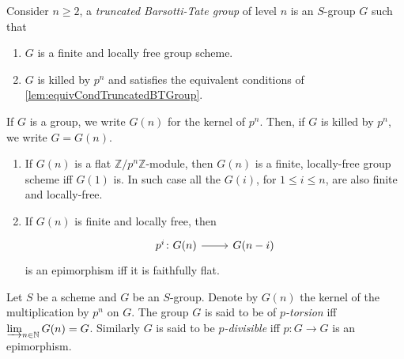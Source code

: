 \begin{defn}
	Consider $n \geq 2$, a {\em truncated Barsotti-Tate group} of level $n$
	is an $S$-group $G$ such that
\begin{enumerate}
	\item $G$ is a finite and locally free group scheme.
	\item $G$ is killed by $p^n$ and satisfies the equivalent conditions of 
		\cref{lem:equivCondTruncatedBTGroup}.
\end{enumerate}
\end{defn}


\begin{defn}[]
	If $G$ is a group, we write $G(n)$ for the kernel of $p^n$.
	Then, if $G$ is killed by $p^n$, we write $G = G(n)$.
\end{defn}


\begin{lem}\label{FlatnessDescentTrBTGroup}\leavevmode\vspace{-.2\baselineskip}
\begin{enumerate}
	\item If $G(n)$ is a flat $\mathbb{Z}/p^n\mathbb{Z}$-module, then $G(n)$
		is a finite, locally-free group scheme iff
		$G(1)$ is. 
		In such case all the $G(i)$, for $1 \leq i \leq n$, are also finite and locally-free.

	\item If $G(n)$ is finite and locally free, then
		\begin{equation}
		\begin{tikzcd}[row sep = 0ex
			,/tikz/column 1/.append style={anchor=base east}
			,/tikz/column 2/.append style={anchor=base west}]
			p^i\colon G(n) \arrow[r, "", rightarrow] &
			G(n-i)
		\end{tikzcd}
		\end{equation} 
		is an epimorphism iff it is faithfully flat.
\end{enumerate}
\end{lem} 


\begin{defn}
	Let $S$ be a scheme and $G$ be an $S$-group.
	Denote by $G(n)$ the kernel of the multiplication by $p^n$ on $G$.
	The group $G$ is said to be of {\em $p$-torsion} iff $\varinjlim_{n \in \mathbb{N}} G(n) = G$.
	Similarly $G$ is said to be {\em $p$-divisible} iff $p\colon G \to G$
	is an epimorphism.
\end{defn}


